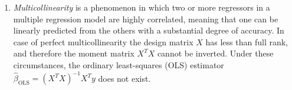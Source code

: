 \documentclass{article}
\begin{document}
\begin{enumerate}
    \item \textit{Multicollinearity} is a phenomenon in which two or more regressors in a multiple regression model are highly correlated, meaning that one can be linearly predicted from the others with a substantial degree of accuracy. In case of perfect multicollinearity the design matrix $X$ has less than full rank, and therefore the moment matrix $X^TX$ cannot be inverted. Under these circumstances, the ordinary least-squares (OLS) estimator $\hat{\beta }_\textrm{OLS}=(X^TX)^{-1}X^Ty$ does not exist.


\end{enumerate}
\end{document}
